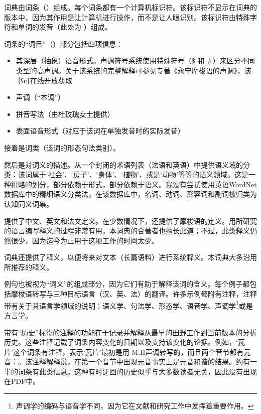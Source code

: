 词典由词条（）组成。每个词条都有一个计算机标识符。该标识符不显示在词典的版本中，因为其作用是让计算机进行操作，而不是让人眼识别。该标识符由特殊字符和单词的发音（此处为 ）组成。

词条的“词目”（）部分包括四项信息：
\begin{itemize}
    \item 其深层（抽象）语音形式。声调符号系统使用特殊符号（\$ 和 \#）来区分不同类型的高声调。关于该系统的完整解释可参见专著《永宁摩梭语的声调》，该书可在线开放获取\parencite[80-90]{michaud2017}
    \item 声调（“本调”）
    \item 拼音写法（由杜玫瑰女士提供）
    \item 表面语音形式（对应于该词在单独发音时的实际发音）
\end{itemize}

接着是词类（该词的形态句法类别）。

然后是对词义的描述。从一个封闭的术语列表（法语和英语）中提供语义域的分类：该词属于‘社会’、‘房子’、‘身体’、‘植物’、或是‘动物’等等的语义领域。这是一种粗略的划分，部分依赖于形式，部分依赖于语义。我没有尝试使用英语WordNet数据库中的精细语义分类法，在该数据库中，名词、动词、形容词和副词被归类为认知同义词集\parencite{fellbaum2005}。

提供了中文、英文和法文定义。在少数情况下，还提供了摩梭语的定义。用所研究的语言编写释义的过程非常有用\parencite{dingemanse_folk_2015}，本词典的合著者也擅长此道；不过，此类释义仍然很少，因为迄今为止用于这项工作的时间太少。

词典还提供了释义，以便将来对文本（长篇语料）进行系统释义。本词典大多沿用\textcite{lidz2010}所推荐的释义。

例句也被视为“词义”的组成部分，因为它们有助于解释该词的含义。每个例子都包括摩梭语转写与三种目标语言（汉、英、法）的翻译。许多示例都附有注释，注释带有关于其语言学领域的说明：语义学、句法学、形态学、语音学、声调学\footnote{声调学的编码与语音学不同，因为它在文献和研究工作中发挥着重要作用。}或是方言学。%

带有“历史”标签的注释的功能在于记录并解释从最早的田野工作到当前版本的分析历史。这些注释记载了词条内容变化的日期以及支持该变化的论据。例如，‘瓦片’这个词条有注释，表示‘瓦片’最初是用 M.H声调转写的，而且两个音节都有元音：。该注释解释说，在第一个音节中出现元音事实上是元音和谐的结果。约有一半的词条有此类信息。这种有时迂回的历史似乎与大多数读者无关，因此没有出现在PDF中。

